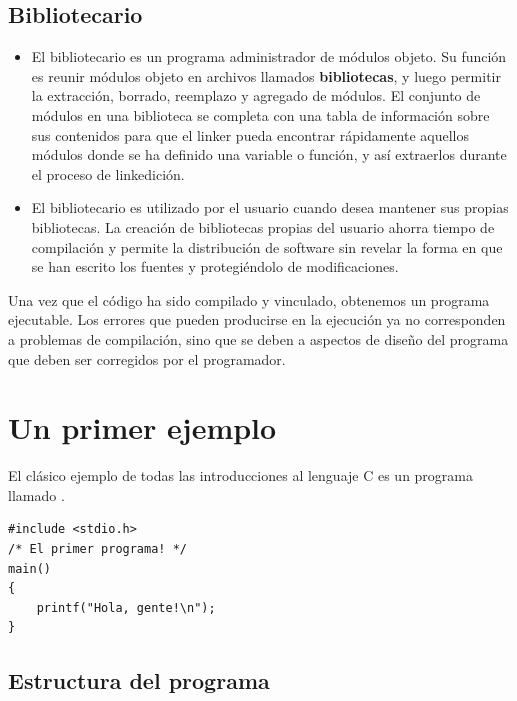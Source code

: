\subsection{Bibliotecario}
\begin{itemize}
	\item El bibliotecario es un programa administrador de módulos objeto. Su función
es reunir módulos objeto en archivos llamados \textbf{bibliotecas}, y luego
permitir la extracción, borrado, reemplazo y agregado de módulos.
El conjunto de módulos en una biblioteca se completa con una tabla de
información sobre sus contenidos para que el linker pueda encontrar
rápidamente aquellos módulos donde se ha definido una variable o
función, y así extraerlos durante el proceso de linkedición. 
\item El bibliotecario es utilizado por el usuario cuando desea mantener sus
propias bibliotecas. La creación de bibliotecas propias del usuario
ahorra tiempo de compilación y permite la distribución de software
sin revelar la forma en que se han escrito los fuentes y
protegiéndolo de modificaciones. 
\end{itemize}

Una vez que el código ha sido compilado y vinculado, obtenemos un programa ejecutable. Los errores que pueden producirse en la ejecución ya no corresponden a problemas de compilación, sino que se deben a aspectos de diseño del programa que deben ser corregidos por el programador.

\section{Un primer ejemplo}

El clásico ejemplo de todas las introducciones al lenguaje C es un programa llamado .

\begin{lstlisting}
#include <stdio.h>
/* El primer programa! */
main()
{
	printf("Hola, gente!\n");
}
\end{lstlisting}

\subsection{Estructura del programa}

